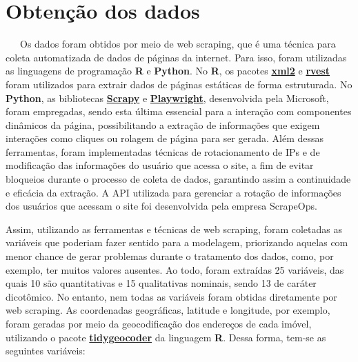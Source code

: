 \documentclass[
  12pt,
  a4paper,
]{scrreprt}
\begin{document}
\section{Obtenção dos dados}\label{obtenuxe7uxe3o-dos-dados}

~~~Os dados foram obtidos por meio de web scraping, que é uma técnica
para coleta automatizada de dados de páginas da internet. Para isso,
foram utilizadas as linguagens de programação \textbf{R} e
\textbf{Python}. No \textbf{R}, os pacotes
\href{https://xml2.r-lib.org/}{\textbf{xml2}} e
\href{https://rvest.tidyverse.org/}{\textbf{rvest}} foram utilizados
para extrair dados de páginas estáticas de forma estruturada. No
\textbf{Python}, as bibliotecas
\href{https://scrapy.org/}{\textbf{Scrapy}} e
\href{https://playwright.dev/python/}{\textbf{Playwright}}, desenvolvida
pela Microsoft, foram empregadas, sendo esta última essencial para a
interação com componentes dinâmicos da página, possibilitando a extração
de informações que exigem interações como cliques ou rolagem de página
para ser gerada. Além dessas ferramentas, foram implementadas técnicas
de rotacionamento de IPs e de modificação das informações do usuário que
acessa o site, a fim de evitar bloqueios durante o processo de coleta de
dados, garantindo assim a continuidade e eficácia da extração. A API
utilizada para gerenciar a rotação de informações dos usuários que
acessam o site foi desenvolvida pela empresa ScrapeOps.

\vspace{12pt}

Assim, utilizando as ferramentas e técnicas de web scraping, foram
coletadas as variáveis que poderiam fazer sentido para a modelagem,
priorizando aquelas com menor chance de gerar problemas durante o
tratamento dos dados, como, por exemplo, ter muitos valores ausentes. Ao
todo, foram extraídas 25 variáveis, das quais 10 são quantitativas e 15
qualitativas nominais, sendo 13 de caráter dicotômico. No entanto, nem
todas as variáveis foram obtidas diretamente por web scraping. As
coordenadas geográficas, latitude e longitude, por exemplo, foram
geradas por meio da geocodificação dos endereços de cada imóvel,
utilizando o pacote
\href{https://jessecambon.github.io/tidygeocoder/}{\textbf{tidygeocoder}}
da linguagem \textbf{R}. Dessa forma, tem-se as seguintes variáveis:
\end{document}
